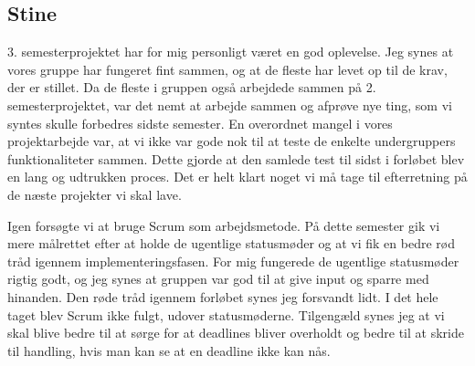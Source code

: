 \subsection{Stine}

3. semesterprojektet har for mig personligt været en god oplevelse. Jeg synes at vores gruppe har fungeret fint sammen, og at de fleste har levet op til de krav, der er stillet.
Da de fleste i gruppen også arbejdede sammen på 2. semesterprojektet, var det nemt at arbejde sammen og afprøve nye ting, som vi syntes skulle forbedres sidste semester.
En overordnet mangel i vores projektarbejde var, at vi ikke var gode nok til at teste de enkelte undergruppers funktionaliteter sammen. Dette gjorde at den samlede test til sidst i forløbet blev en lang og udtrukken proces.
Det er helt klart noget vi må tage til efterretning på de næste projekter vi skal lave. 

Igen forsøgte vi at bruge Scrum som arbejdsmetode. På dette semester gik vi mere målrettet efter at holde de ugentlige statusmøder og at vi fik en bedre rød tråd igennem implementeringsfasen.
For mig fungerede de ugentlige statusmøder rigtig godt, og jeg synes at gruppen var god til at give input og sparre med hinanden.
Den røde tråd igennem forløbet synes jeg forsvandt lidt. I det hele taget blev Scrum ikke fulgt, udover statusmøderne. 
Tilgengæld synes jeg at vi skal blive bedre til at sørge for at deadlines bliver overholdt og bedre til at skride til handling, hvis man kan se at en deadline ikke kan nås.